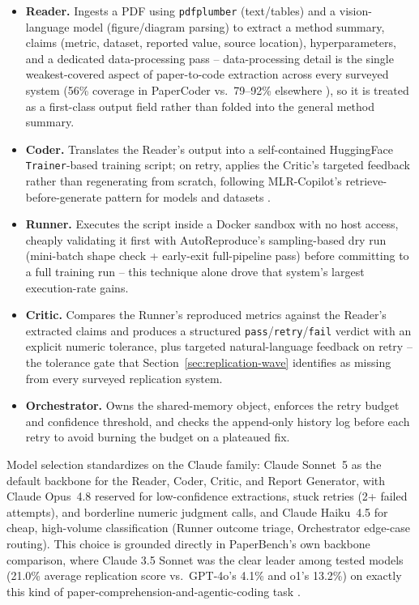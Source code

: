 \documentclass[11pt]{article}
\begin{document}
\begin{itemize}
  \item \textbf{Reader.} Ingests a PDF using \texttt{pdfplumber} (text/tables) and a
  vision-language model (figure/diagram parsing) to extract a method summary, claims
  (metric, dataset, reported value, source location), hyperparameters, and a dedicated
  data-processing pass -- data-processing detail is the single weakest-covered aspect of
  paper-to-code extraction across every surveyed system (56\% coverage in PaperCoder vs.\
  79--92\% elsewhere \cite{seo2025papercoder}), so it is treated as a first-class output
  field rather than folded into the general method summary.
  \item \textbf{Coder.} Translates the Reader's output into a self-contained HuggingFace
  \texttt{Trainer}-based training script; on retry, applies the Critic's targeted
  feedback rather than regenerating from scratch, following MLR-Copilot's
  retrieve-before-generate pattern for models and datasets \cite{li2024mlrcopilot}.
  \item \textbf{Runner.} Executes the script inside a Docker sandbox with no host
  access, cheaply validating it first with AutoReproduce's sampling-based dry run
  (mini-batch shape check + early-exit full-pipeline pass) before committing to a full
  training run \cite{zhao2025autoreproduce} -- this technique alone drove that system's
  largest execution-rate gains.
  \item \textbf{Critic.} Compares the Runner's reproduced metrics against the Reader's
  extracted claims and produces a structured \texttt{pass}/\texttt{retry}/\texttt{fail}
  verdict with an explicit numeric tolerance, plus targeted natural-language feedback on
  retry -- the tolerance gate that Section~\ref{sec:replication-wave} identifies as
  missing from every surveyed replication system.
  \item \textbf{Orchestrator.} Owns the shared-memory object, enforces the retry budget
  and confidence threshold, and checks the append-only history log before each retry to
  avoid burning the budget on a plateaued fix.
\end{itemize}

Model selection standardizes on the Claude family: Claude Sonnet~5 as the default
backbone for the Reader, Coder, Critic, and Report Generator, with Claude Opus~4.8
reserved for low-confidence extractions, stuck retries (2+ failed attempts), and
borderline numeric judgment calls, and Claude Haiku~4.5 for cheap, high-volume
classification (Runner outcome triage, Orchestrator edge-case routing). This choice is
grounded directly in PaperBench's own backbone comparison, where Claude 3.5 Sonnet was
the clear leader among tested models (21.0\% average replication score vs.\ GPT-4o's
4.1\% and o1's 13.2\%) on exactly this kind of paper-comprehension-and-agentic-coding
task \cite{starace2025paperbench}.
\end{document}
